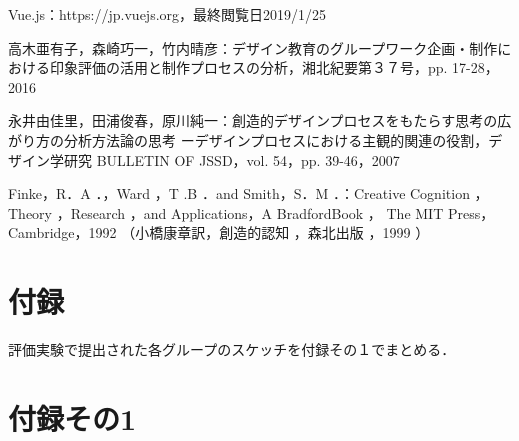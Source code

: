 \documentclass{funthesis}
\begin{document}
\begin{thebibliography}{9}
Vue.js：https://jp.vuejs.org，最終閲覧日2019/1/25

高木亜有子，森崎巧一，竹内晴彦：デザイン教育のグループワーク企画・制作における印象評価の活用と制作プロセスの分析，湘北紀要第３７号，pp. 17-28，2016

永井由佳里，田浦俊春，原川純一：創造的デザインプロセスをもたらす思考の広がり方の分析方法論の思考 ーデザインプロセスにおける主観的関連の役割，デザイン学研究 BULLETIN OF JSSD，vol. 54，pp. 39-46，2007

Finke，R．A ．，Ward ，T .B ．and Smith，S．M ．：Creative Cognition ， Theory ，Research ，and
Applications，A BradfordBook ， The MIT Press，Cambridge，1992 （小橋康章訳，創造的認知 ，森北出版 ，1999 ）






\end{thebibliography}


\appendix

\chapter*{付録} %
評価実験で提出された各グループのスケッチを付録その１でまとめる．

\chapter*{付録その1}
\end{document}
